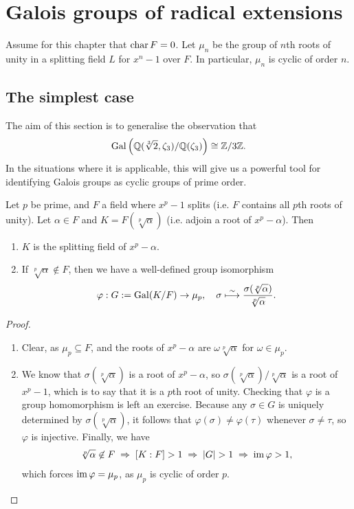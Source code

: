 \chapter{Galois groups of radical extensions}

Assume for this chapter that $\operatorname{char}{{F}} = 0$. Let $\mu_n$ be the group of $n$th roots of unity in a splitting field $L$ for $x^n - 1$ over $F$. In particular, $\mu_n$ is cyclic of order $n$.

\section{The simplest case}

The aim of this section is to generalise the observation that
\[
    \operatorname{Gal}\left(\mathbb{{Q}}(\sqrt[3]{2}, \zeta_3) / \mathbb{{Q}}(\zeta_3)\right) \cong \mathbb{{Z}}/{{3}}\mathbb{{Z}}.
\]
In the situations where it is applicable, this will give us a powerful tool for identifying Galois groups as cyclic groups of prime order.

\begin{proposition}
    Let $p$ be prime, and $F$ a field where $x^p - 1$ splits (i.e. $F$ contains all $p$th roots of unity). Let $\alpha \in F$ and $K = F(\sqrt[p]{\alpha})$ (i.e. adjoin a root of $x^p - \alpha$). Then
    \begin{enumerate}[label=(\alph*)]
        \item $K$ is the splitting field of $x^p - \alpha$.
        \item If $\sqrt[p]{\alpha} \not\in F$, then we have a well-defined group isomorphism
        \[
            \varphi: G := \operatorname{Gal}(K/F) \to \mu_p, \quad \sigma \stackrel{\sim}{\longmapsto} \frac{\sigma(\sqrt[p]{\alpha})}{\sqrt[p]{\alpha}}.
        \]
    \end{enumerate}
\end{proposition}

\begin{proof}~
    \begin{enumerate}[label=(\alph*)]
        \item Clear, as $\mu_p \subseteq F$, and the roots of $x^p - \alpha$ are $\omega \sqrt[p]\alpha$ for $\omega \in \mu_p$.
        \item We know that $\sigma(\sqrt[p]{\alpha})$ is a root of $x^p - \alpha$, so $\sigma(\sqrt[p]{\alpha})/\sqrt[p]{\alpha}$ is a root of $x^p - 1$, which is to say that it is a $p$th root of unity. Checking that $\varphi$ is a group homomorphism is left an exercise. Because any $\sigma \in G$ is uniquely determined by $\sigma(\sqrt[p]{\alpha})$, it follows that $\varphi(\sigma) \neq \varphi(\tau)$ whenever $\sigma \neq \tau$, so $\varphi$ is injective. Finally, we have
        \begin{align*}
            \sqrt[p]{\alpha} \not\in F
            \; \Rightarrow \;
            [K : F] > 1
            \; \Rightarrow \;
            |G| > 1
            \; \Rightarrow \;
            \operatorname{im}{\varphi} > 1,
        \end{align*}
        which forces $\operatorname{im}{\varphi} = \mu_p$, as $\mu_p$ is cyclic of order $p$. \qedhere
    \end{enumerate}
\end{proof}

